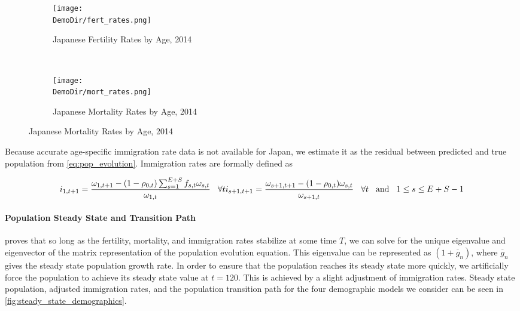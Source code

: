 \documentclass[10pt]{article}
\renewcommand{\thesection}{\arabic{section}}
\renewcommand{\thesubsection}{\thesection.\arabic{subsection}}
\renewcommand{\thesubsubsection}{\thesubsection.\arabic{subsubsection}}
\numberwithin{equation}{subsection}
\newcommand*{\DemoDir}{../../code/Rick/OUTPUT/Demographics}
\begin{document}
\begin{appendices}
\begin{figure}[H]
   \caption{\label{fig:\thesubsubsection.1}Fertility and Mortality Rates by Age}
   \begin{subfigure}{0.5\textwidth}
      \centering
      \texttt{[image: \\DemoDir/fert\_rates.png]}
      \caption{Japanese Fertility Rates by Age, 2014}
   \end{subfigure}%
   ~ %
   \begin{subfigure}{0.5\textwidth}
      \centering
      \texttt{[image: \\DemoDir/mort\_rates.png]}
      \caption{Japanese Mortality Rates by Age, 2014}
   \end{subfigure}
\end{figure}

\par Because accurate age-specific immigration rate data is not available for Japan, we estimate it as the residual between predicted and true population from \ref{eq:pop_evolution}. Immigration rates are formally defined as

\begin{dmath}
   {i_{1,t+1} = \frac{\omega_{1,t+1} - (1-\rho_{0,t})\sum_{s=1}^{E+S}f_{s,t}\omega_{s,t}}{\omega_{1,t}} \hspace{3mm} \forall t} \\
   {i_{s+1,t+1} = \frac{\omega_{s+1,t+1} - (1-\rho_{0,t})\omega_{s,t}}{\omega_{s+1,t}} \hspace{3mm} \forall t \hspace{3mm} \text{and} \hspace{3mm} 1 \leq s \leq E + S - 1}
\end{dmath}


\paragraph{Population Steady State and Transition Path}

\par \cite{E2020} proves that so long as the fertility, mortality, and immigration rates stabilize at some time \(T\), we can solve for the unique eigenvalue and eigenvector of the matrix representation of the population evolution equation. This eigenvalue can be represented as \((1 + \overline{g}_n)\), where \(\overline{g}_n\) gives the steady state population growth rate. In order to ensure that the population reaches its steady state more quickly, we artificially force the population to achieve its steady state value at \(t=120\). This is achieved by a slight adjustment of immigration rates. Steady state population, adjusted immigration rates, and the population transition path for the four demographic models we consider can be seen in \autoref{fig:steady_state_demographics}.


\end{appendices}
\end{document}
